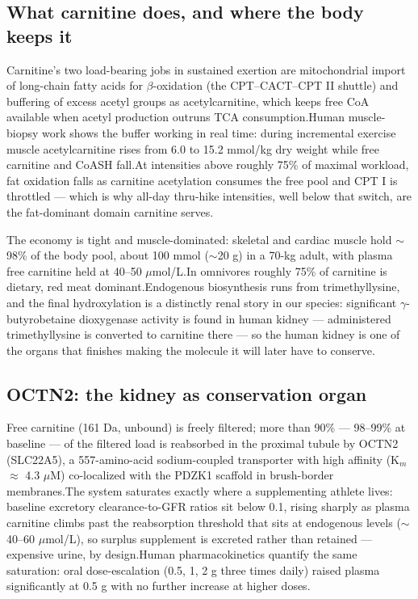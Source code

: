 \documentclass[11pt]{article}
\newcommand{\src}[1]{\allowbreak[#1]}
\begin{document}
\subsection{What carnitine does, and where the body keeps it}

Carnitine's two load-bearing jobs in sustained exertion are mitochondrial import of long-chain fatty acids for $\beta$-oxidation (the CPT--CACT--CPT II shuttle) and buffering of excess acetyl groups as acetylcarnitine, which keeps free CoA available when acetyl production outruns TCA consumption.\src{96}\src{88} Human muscle-biopsy work shows the buffer working in real time: during incremental exercise muscle acetylcarnitine rises from 6.0 to 15.2 mmol/kg dry weight while free carnitine and CoASH fall.\src{79} At intensities above roughly 75\% of maximal workload, fat oxidation falls as carnitine acetylation consumes the free pool and CPT I is throttled --- which is why all-day thru-hike intensities, well below that switch, are the fat-dominant domain carnitine serves.\src{131}\src{154}

The economy is tight and muscle-dominated: skeletal and cardiac muscle hold $\sim$98\% of the body pool, about 100 mmol ($\sim$20 g) in a 70-kg adult, with plasma free carnitine held at 40--50 $\mu$mol/L.\src{128}\src{127} In omnivores roughly 75\% of carnitine is dietary, red meat dominant.\src{96} Endogenous biosynthesis runs from trimethyllysine, and the final hydroxylation is a distinctly renal story in our species: significant $\gamma$-butyrobetaine dioxygenase activity is found in human kidney --- administered trimethyllysine is converted to carnitine there --- so the human kidney is one of the organs that finishes making the molecule it will later have to conserve.\src{117}

\subsection{OCTN2: the kidney as conservation organ}

Free carnitine (161 Da, unbound) is freely filtered; more than 90\% --- 98--99\% at baseline --- of the filtered load is reabsorbed in the proximal tubule by OCTN2 (SLC22A5), a 557-amino-acid sodium-coupled transporter with high affinity (K$_m$ $\approx$ 4.3 $\mu$M) co-localized with the PDZK1 scaffold in brush-border membranes.\src{91}\src{121}\src{129} The system saturates exactly where a supplementing athlete lives: baseline excretory clearance-to-GFR ratios sit below 0.1, rising sharply as plasma carnitine climbs past the reabsorption threshold that sits at endogenous levels ($\sim$40--60 $\mu$mol/L), so surplus supplement is excreted rather than retained --- expensive urine, by design.\src{91}\src{112} Human pharmacokinetics quantify the same saturation: oral dose-escalation (0.5, 1, 2 g three times daily) raised plasma significantly at 0.5 g with no further increase at higher doses.\src{269}
\end{document}
